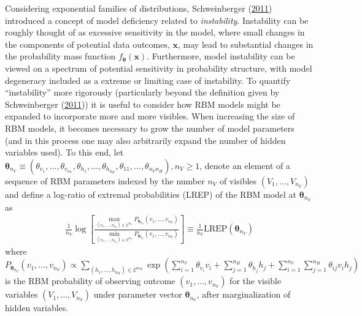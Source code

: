 \documentclass[]{article}
\theoremstyle{definition}
\newcommand{\nv}{{n_{\scriptscriptstyle V}}}
\newcommand{\nh}{{n_{\scriptscriptstyle H}}}
\begin{document}
Considering exponential families of distributions, Schweinberger
(\protect\hyperlink{ref-schweinberger2011instability}{2011}) introduced
a concept of model deficiency related to \emph{instability}. Instability
can be roughly thought of as excessive sensitivity in the model, where
small changes in the components of potential data outcomes,
\(\boldsymbol x\), may lead to substantial changes in the probability
mass function \(f_{\boldsymbol \theta}(\boldsymbol x)\). Furthermore,
model instability can be viewed on a spectrum of potential sensitivity
in probability structure, with model degeneracy included as a extreme or
limiting case of instability. To quantify ``instability'' more
rigorously (particularly beyond the definition given by Schweinberger
(\protect\hyperlink{ref-schweinberger2011instability}{2011})) it is
useful to consider how RBM models might be expanded to incorporate more
and more visibles. When increasing the size of RBM models, it becomes
necessary to grow the number of model parameters (and in this process
one may also arbitrarily expand the number of hidden variables used). To
this end, let
\(\boldsymbol \theta_{\nv} \equiv (\theta_{v_1}, \dots, \theta_{v_\nv}, \theta_{h_1}, \dots, \theta_{h_\nh}, \theta_{11}, \dots, \theta_{\nv \nh}), \nv \ge 1\),
denote an element of a sequence of RBM parameters indexed by the number
\(\nv\) of visibles \((V_1, \dots, V_\nv)\) and define a log-ratio of
extremal probabilities (LREP) of the RBM model at
\(\boldsymbol \theta_{\nv}\) as \begin{align}
\frac{1}{\nv} \log \left[\frac{\max\limits_{(v_1, \dots, v_\nv) \in \mathcal{C}^\nv}P_{\boldsymbol \theta_\nv}(v_1, \dots, v_\nv)}{\min\limits_{(v_1, \dots, v_\nv) \in \mathcal{C}^\nv}P_{\boldsymbol \theta_\nv}(v_1, \dots, v_\nv)}\right] \equiv \frac{1}{\nv} \text{LREP}(\boldsymbol \theta_\nv) \label{eq:elpr}
\end{align} where
\(P_{\boldsymbol \theta_\nv}(v_1, \dots, v_\nv) \propto \sum_{(h_1, \dots, h_\nh) \in \mathcal{C}^\nh}\exp\left(\sum_{i = 1}^\nv \theta_{v_i} v_i + \sum_{j = 1}^\nh \theta_{h_j} h_j + \sum_{i = 1}^\nv \sum_{j = 1}^\nh \theta_{ij} v_i h_j\right)\)
is the RBM probability of observing outcome \((v_1, \dots, v_\nv)\) for
the visible variables \((V_1, \dots, V_\nv)\) under parameter vector
\(\boldsymbol \theta_\nv\), after marginalization of hidden variables.
\end{document}
